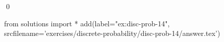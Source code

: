 
\begin{ex} 
  \label{ex:disc-prob-14}
  
  \qed
\end{ex} 
\begin{python0}
from solutions import *
add(label="ex:disc-prob-14",
    srcfilename='exercises/discrete-probability/disc-prob-14/answer.tex') 
\end{python0}
